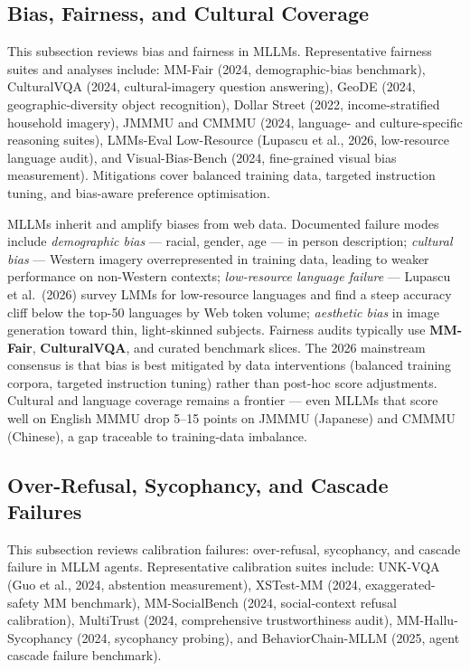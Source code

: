 \subsection{Bias, Fairness, and Cultural Coverage}\label{bias-fairness-and-cultural-coverage}

This subsection reviews bias and fairness in MLLMs. Representative fairness suites and analyses include: MM-Fair (2024, demographic-bias benchmark), CulturalVQA (2024, cultural-imagery question answering), GeoDE (2024, geographic-diversity object recognition), Dollar Street (2022, income-stratified household imagery), JMMMU and CMMMU (2024, language- and culture-specific reasoning suites), LMMs-Eval Low-Resource (Lupascu et al., 2026, low-resource language audit), and Visual-Bias-Bench (2024, fine-grained visual bias measurement). Mitigations cover balanced training data, targeted instruction tuning, and bias-aware preference optimisation.

MLLMs inherit and amplify biases from web data. Documented failure modes include \emph{demographic bias} --- racial, gender, age --- in person description; \emph{cultural bias} --- Western imagery overrepresented in training data, leading to weaker performance on non-Western contexts; \emph{low-resource language failure} --- Lupascu et al.~(2026) survey LMMs for low-resource languages and find a steep accuracy cliff below the top-50 languages by Web token volume; \emph{aesthetic bias} in image generation toward thin, light-skinned subjects. Fairness audits typically use \textbf{MM-Fair}, \textbf{CulturalVQA}, and curated benchmark slices. The 2026 mainstream consensus is that bias is best mitigated by data interventions (balanced training corpora, targeted instruction tuning) rather than post-hoc score adjustments. Cultural and language coverage remains a frontier --- even MLLMs that score well on English MMMU drop 5--15 points on JMMMU (Japanese) and CMMMU (Chinese), a gap traceable to training-data imbalance.

\subsection{Over-Refusal, Sycophancy, and Cascade Failures}\label{over-refusal-sycophancy-and-cascade-failures}

This subsection reviews calibration failures: over-refusal, sycophancy, and cascade failure in MLLM agents. Representative calibration suites include: UNK-VQA (Guo et al., 2024, abstention measurement), XSTest-MM (2024, exaggerated-safety MM benchmark), MM-SocialBench (2024, social-context refusal calibration), MultiTrust (2024, comprehensive trustworthiness audit), MM-Hallu-Sycophancy (2024, sycophancy probing), and BehaviorChain-MLLM (2025, agent cascade failure benchmark).

